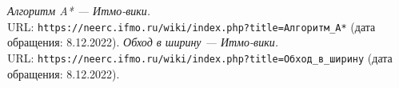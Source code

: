\begin{thebibliography}{99}
{\itshape Алгоритм A* — Итмо-вики.} \\URL: \texttt{https://neerc.ifmo.ru/wiki/index.php?title=Алгоритм\_А*} (дата обращения: 8.12.2022).
{\itshape Обход в ширину — Итмо-вики.} \\URL: \texttt{https://neerc.ifmo.ru/wiki/index.php?title=Обход\_в\_ширину} (дата обращения: 8.12.2022).
\end{thebibliography}
\pagebreak


